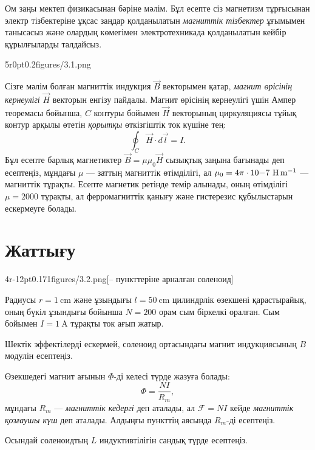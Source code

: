 
Ом заңы мектеп физикасынан бәріне мәлім. Бұл есепте сіз магнетизм тұрғысынан электр тізбектеріне ұқсас заңдар қолданылатын \textit{магниттік тізбектер} ұғымымен танысасыз және олардың көмегімен электротехникада қолданылатын кейбір құрылғыларды талдайсыз.

\pic5r{0pt}{0.2}{figures/3.1.png}

Сізге мәлім болған магниттік индукция $\vec B$ векторымен қатар, \textit{магнит өрісінің кернеулігі} $\vec H$ векторын енгізу пайдалы. Магнит өрісінің кернеулігі үшін Ампер теоремасы бойынша, $C$ контуры бойымен $\vec H$ векторының циркуляциясы тұйық контур арқылы өтетін \textit{қорытқы} өткізгіштік ток күшіне тең:
$$
\oint_C\vec H\cdot d\vec l = I.
$$
Бұл есепте барлық магнетиктер $\vec B = \mu\mu_0\vec H$ сызықтық заңына бағынады деп есептеңіз, мұндағы $\mu$ --- заттың магниттік өтімділігі, ал $\mu_0=4\pi\cdot10{-7}~\unit{\H\per\m}$ --- магниттік тұрақты. Есепте магнетик ретінде темір алынады, оның өтімділігі $\mu=2000$ тұрақты, ал ферромагниттік қанығу және гистерезис құбылыстарын ескермеуге болады.

\part{Жаттығу}

\pic4r{-12pt}{0.171}{figures/3.2.png}[-- пункттеріне арналған соленоид]

Радиусы $r=\qty{1}{\cm}$ және ұзындығы $l=\qty{50}{\cm}$ цилиндрлік өзекшені қарастырайық, оның бүкіл ұзындығы бойынша $N=200$ орам сым біркелкі оралған. Сым бойымен $I=\qty{1}{\A}$ тұрақты ток ағып жатыр.
\begin{task}
    \item Шектік эффектілерді ескермей, соленоид ортасындағы магнит индукциясының $B$ модулін есептеңіз.
\end{task}

\begin{task}
    \item Өзекшедегі магнит ағынын $\Phi$-ді келесі түрде жазуға болады:
    \begin{equation}\label{task:3.1}
    \Phi = \frac{NI}{R_m},
    \end{equation}
    мұндағы $R_m$ --- \textit{магниттік кедергі} деп аталады, ал $\mathcal F=NI$ кейде \textit{магниттік қозғаушы күш} деп аталады. Алдыңғы пункттің аясында $R_m$-ді есептеңіз.
    \item Осындай соленоидтың $L$ индуктивтілігін сандық түрде есептеңіз.
\end{task}

